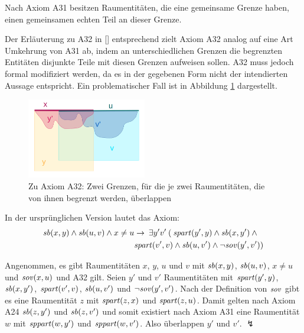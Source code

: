     Nach Axiom A31 besitzen Raumentitäten, die eine gemeinsame Grenze haben, einen gemeinsamen echten Teil an dieser Grenze.
    
    Der Erläuterung zu A32 in [\cite{baumann-r-2019--a}] entsprechend zielt Axiom A32
		analog auf eine Art Umkehrung von A31 ab,
		indem an unterschiedlichen Grenzen die begrenzten Entitäten disjunkte Teile 
		mit diesen Grenzen aufweisen sollen.
    A32 muss jedoch formal modifiziert werden, da es in der gegebenen Form nicht der intendierten Aussage entspricht. Ein problematischer Fall ist in Abbildung \ref{fig:a32} dargestellt.
    
    \begin{figure}[ht]
        \centering
        \includegraphics[height=3.5cm]{gfx/a32.png}
        \caption[Zu Axiom 32]{Zu Axiom A32: Zwei Grenzen, für die je zwei Raumentitäten, die von ihnen begrenzt werden, überlappen}
        \label{fig:a32}
    \end{figure}
    
    In der ursprünglichen Version lautet das Axiom:
    \begin{align*}
        \mathit{sb}(x,y) \land \mathit{sb}(u,v) \land x\neq u &\to\: 
        \exists y'v'\:(\: \mathit{spart}(y',y) \land \mathit{sb}(x,y') 
        \land \mbox{} \\
        &\mathit{spart}(v',v) 
        \land \mathit{sb}(u,v') \land \neg \mathit{sov}(y',v'))
    \end{align*}

    
    Angenommen, es gibt Raumentitäten $x$, $y$, $u$ und $v$ mit $\mathit{sb}(x,y)$, $\mathit{sb}(u,v)$, $x \neq u$ und $\mathit{sov}(x,u)$ und A32 gilt.
    Seien $y'$ und $v'$ Raumentitäten mit $\mathit{spart}(y',y)$, $\mathit{sb}(x,y')$, $\mathit{spart}(v',v)$, $\mathit{sb}(u,v')$ und $\neg \mathit{sov}(y',v')$.
    Nach der Definition von $\mathit{sov}$ gibt es eine Raumentität $z$ mit $\mathit{spart}(z,x)$ und $\mathit{spart}(z,u)$.
    Damit gelten nach Axiom A24
    $\mathit{sb}(z,y')$ und $\mathit{sb}(z,v')$ und somit existiert nach Axiom A31 eine Raumentität $w$ mit $\mathit{sppart}(w,y')$ und $\mathit{sppart}(w,v')$.
    Also überlappen $y'$ und $v'$. $\lightning$
    
